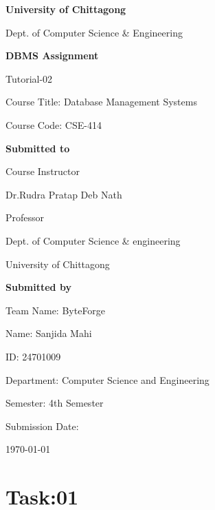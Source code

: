 \documentclass[15pt,a4paper]{article}
\begin{document}
\begin{titlepage}
    \centering
     \vspace*{2.5cm}
     {\LARGE \textbf{University of Chittagong}\par}
     {\Large Dept. of Computer Science \& Engineering \par}

    \vspace*{2cm}

    {\LARGE \textbf{DBMS Assignment}\par}
    \vspace{0.5cm}
    {\Large Tutorial-02 \par}
    Course Title: Database Management Systems\par
    Course Code: CSE-414\par
    \vspace{1.5cm}
     \textbf{Submitted to}\par
    \vspace{0.3cm}
    Course Instructor\par
    Dr.Rudra Pratap Deb Nath\par
    Professor\par
    Dept. of Computer Science \& engineering\par
    University of Chittagong\par
     \vspace{1.5cm}
    \textbf{Submitted by}\par
    \vspace{0.3cm}
    Team Name: ByteForge\par
    Name: Sanjida Mahi\par
    ID: 24701009\par
    Department: Computer Science and Engineering\par
    Semester: 4th Semester\par

   

   
    

    \vfill

  
    

    \vspace{0.5cm}
    Submission Date:\par
    \today

\end{titlepage}


\setlength{\parindent}{0pt} %
\setlength{\parskip}{6pt} 
\section*{Task:01}
\end{document}
